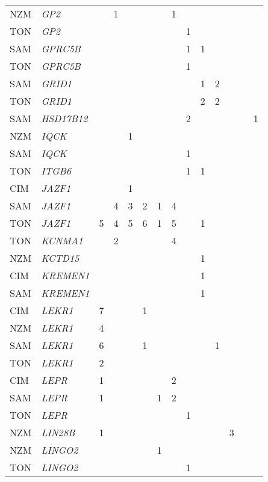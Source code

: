 \documentclass[twoside,openright]{report}
\begin{document}
\begin{ThreePartTable}
\begin{longtable}[t]{llllllllllllll}
NZM & \em{GP2} &  & 1 &  &  &  & 1 &  &  &  &  &  & \\
TON & \em{GP2} &  &  &  &  &  &  & 1 &  &  &  &  & \\
SAM & \em{GPRC5B} &  &  &  &  &  &  & 1 & 1 &  &  &  & \\
TON & \em{GPRC5B} &  &  &  &  &  &  & 1 &  &  &  &  & \\
SAM & \em{GRID1} &  &  &  &  &  &  &  & 1 & 2 &  &  & \\
TON & \em{GRID1} &  &  &  &  &  &  &  & 2 & 2 &  &  & \\
SAM & \em{HSD17B12} &  &  &  &  &  &  & 2 &  &  &  &  & 1\\
NZM & \em{IQCK} &  &  & 1 &  &  &  &  &  &  &  &  & \\
SAM & \em{IQCK} &  &  &  &  &  &  & 1 &  &  &  &  & \\
TON & \em{ITGB6} &  &  &  &  &  &  & 1 & 1 &  &  &  & \\
CIM & \em{JAZF1} &  &  & 1 &  &  &  &  &  &  &  &  & \\
SAM & \em{JAZF1} &  & 4 & 3 & 2 & 1 & 4 &  &  &  &  &  & \\
TON & \em{JAZF1} & 5 & 4 & 5 & 6 & 1 & 5 &  & 1 &  &  &  & \\
TON & \em{KCNMA1} &  & 2 &  &  &  & 4 &  &  &  &  &  & \\
NZM & \em{KCTD15} &  &  &  &  &  &  &  & 1 &  &  &  & \\
CIM & \em{KREMEN1} &  &  &  &  &  &  &  & 1 &  &  &  & \\
SAM & \em{KREMEN1} &  &  &  &  &  &  &  & 1 &  &  &  & \\
CIM & \em{LEKR1} & 7 &  &  & 1 &  &  &  &  &  &  &  & \\
NZM & \em{LEKR1} & 4 &  &  &  &  &  &  &  &  &  &  & \\
SAM & \em{LEKR1} & 6 &  &  & 1 &  &  &  &  & 1 &  &  & \\
TON & \em{LEKR1} & 2 &  &  &  &  &  &  &  &  &  &  & \\
CIM & \em{LEPR} & 1 &  &  &  &  & 2 &  &  &  &  &  & \\
SAM & \em{LEPR} & 1 &  &  &  & 1 & 2 &  &  &  &  &  & \\
TON & \em{LEPR} &  &  &  &  &  &  & 1 &  &  &  &  & \\
NZM & \em{LIN28B} & 1 &  &  &  &  &  &  &  &  & 3 &  & \\
NZM & \em{LINGO2} &  &  &  &  & 1 &  &  &  &  &  &  & \\
TON & \em{LINGO2} &  &  &  &  &  &  & 1 &  &  &  &  & \\

\end{longtable}
\end{ThreePartTable}
\end{document}
